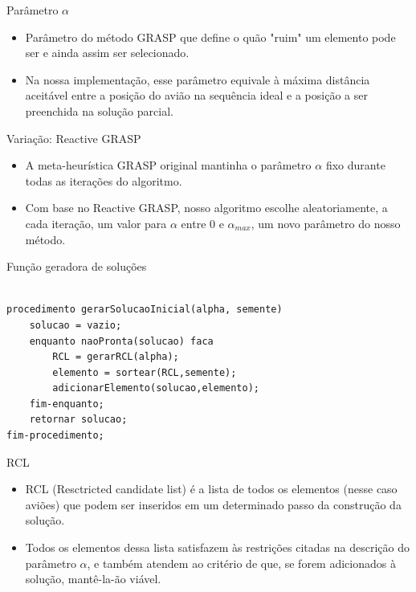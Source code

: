 \documentclass[xcolor=dvipsnames]{beamer}
\begin{document}
\begin{frame}{Parâmetro $\alpha$}
  \begin{itemize}[<+-| alert@+>]
  \item{Parâmetro do método GRASP que define o quão "ruim" um elemento pode ser e ainda assim ser selecionado.}
  \item{Na nossa implementação, esse parâmetro equivale à máxima distância aceitável entre a posição do avião na sequência ideal e a posição a ser preenchida na solução parcial.}
 \end{itemize}  
\end{frame}

\begin{frame}{Variação: Reactive GRASP}
 \begin{itemize}[<+-| alert@+>]
  \item{A meta-heurística GRASP original mantinha o parâmetro $\alpha$ fixo durante todas as iterações do algoritmo.}
  \item{Com base no Reactive GRASP, nosso algoritmo escolhe aleatoriamente, a cada iteração, um valor para $\alpha$ entre 0 e $\alpha_{max}$, um novo parâmetro do nosso método.}
 \end{itemize}  
\end{frame}

\begin{frame}[fragile]{Função geradora de soluções}

\begin{lstlisting}

procedimento gerarSolucaoInicial(alpha, semente)
    solucao = vazio;
    enquanto naoPronta(solucao) faca
        RCL = gerarRCL(alpha);
        elemento = sortear(RCL,semente);
        adicionarElemento(solucao,elemento);
    fim-enquanto;
    retornar solucao;
fim-procedimento;

\end{lstlisting}

\end{frame}

\begin{frame}{RCL}
 \begin{itemize}[<+-| alert@+>]
  \item{RCL (Resctricted candidate list) é a lista de todos os elementos (nesse caso aviões) que podem ser inseridos em um determinado passo da construção da solução.}
  \item{Todos os elementos dessa lista satisfazem às restrições citadas na descrição do parâmetro $\alpha$, e também atendem ao critério de que, se forem adicionados à solução, mantê-la-ão viável.}
 \end{itemize}  
\end{frame}
\end{document}
